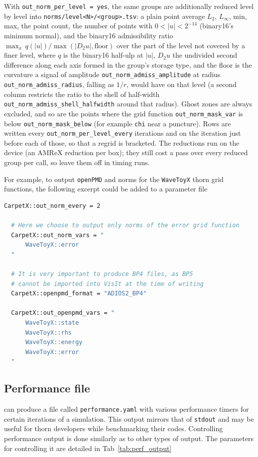 With \texttt{out\_norm\_per\_level = yes}, the same groups are additionally reduced level by level into \texttt{norms/level<N>/<group>.tsv}: a plain point average $L_2$, $L_\infty$, min, max, the point count, the number of points with $0 < |u| < 2^{-14}$ (binary16's minimum normal), and the binary16 admissibility ratio $\max_x\, q(|u|)/\max(|D_2 u|, \mathrm{floor})$ over the part of the level not covered by a finer level, where $q$ is the binary16 half-ulp at $|u|$, $D_2 u$ the undivided second difference along each axis formed in the group's storage type, and the floor is the curvature a signal of amplitude \texttt{out\_norm\_admiss\_amplitude} at radius \texttt{out\_norm\_admiss\_radius}, falling as $1/r$, would have on that level (a second column restricts the ratio to the shell of half-width \texttt{out\_norm\_admiss\_shell\_halfwidth} around that radius). Ghost zones are always excluded, and so are the points where the grid function \texttt{out\_norm\_mask\_var} is below \texttt{out\_norm\_mask\_below} (for example \texttt{chi} near a puncture). Rows are written every \texttt{out\_norm\_per\_level\_every} iterations and on the iteration just before each of those, so that a regrid is bracketed. The reductions run on the device (an AMReX reduction per box); they still cost a pass over every reduced group per call, so leave them off in timing runs.

For example, to output \texttt{openPMD} and norms for the \texttt{WaveToyX} thorn grid functions, the following excerpt could be added to a parameter file

\begin{lstlisting}[language=bash]
  CarpetX::out_norm_every = 2
  
  # Here we choose to output only norms of the error grid function    
  CarpetX::out_norm_vars = "
      WaveToyX::error
  "

  # It is very important to produce BP4 files, as BP5
  # cannot be imported into VisIt at the time of writing
  CarpetX::openpmd_format = "ADIOS2_BP4"
  
  CarpetX::out_openpmd_vars = "
      WaveToyX::state
      WaveToyX::rhs
      WaveToyX::energy
      WaveToyX::error
  "
\end{lstlisting}

\subsection{Performance file}

\CarpetX\space can produce a file called \texttt{performance.yaml} with various performance timers for certain iterations of a simulation. This output mirrors that of \texttt{stdout} and may be useful for thorn developers while benchmarking their codes. Controlling performance output is done similarly as to other types of output. The parameters for controlling it are detailed in Tab~\ref{tab:perf_output}


